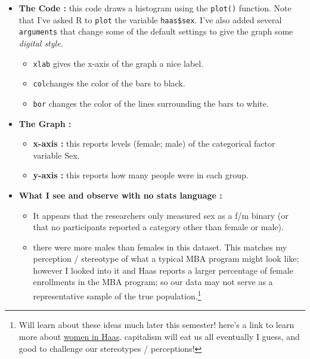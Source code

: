 \documentclass[
  letterpaper,
  DIV=11,
  numbers=noendperiod,
  oneside]{scrreprt}
\begin{document}
\begin{itemize}
\item
  \textbf{The Code :} this code draws a histogram using the
  \texttt{plot()} function. Note that I've asked R to \texttt{plot} the
  variable \texttt{haas\$sex}. I've also added several
  \texttt{arguments} that change some of the default settings to give
  the graph some \emph{digital style.}

  \begin{itemize}
  \item
    \texttt{xlab} gives the x-axis of the graph a nice label.
  \item
    \texttt{col}changes the color of the bars to black.
  \item
    \texttt{bor} changes the color of the lines surrounding the bars to
    white.
  \end{itemize}
\item
  \textbf{The Graph :}

  \begin{itemize}
  \item
    \textbf{x-axis :} this reports levels (female; male) of the
    categorical factor variable Sex.~
  \item
    \textbf{y-axis :} this reports how many people were in each group.
  \end{itemize}
\item
  \textbf{What I see and observe with no stats language :}

  \begin{itemize}
  \item
    It appears that the researchers only measured sex as a f/m binary
    (or that no participants reported a category other than female or
    male).
  \item
    there were more males than females in this dataset. This matches my
    perception / stereotype of what a typical MBA program might look
    like; however I looked into it and Haas reports a larger percentage
    of female enrollments in the MBA program; so our data may not serve
    as a representative sample of the true population.\footnote{Will
      learn about these ideas much later this semester! here's a link to
      learn more about
      \href{https://mba.haas.berkeley.edu/student-life/women}{women in
      Haas}. capitalism will eat us all eventually I guess, and good to
      challenge our stereotypes / perceptions!}\\
  \end{itemize}
\end{itemize}
\end{document}
